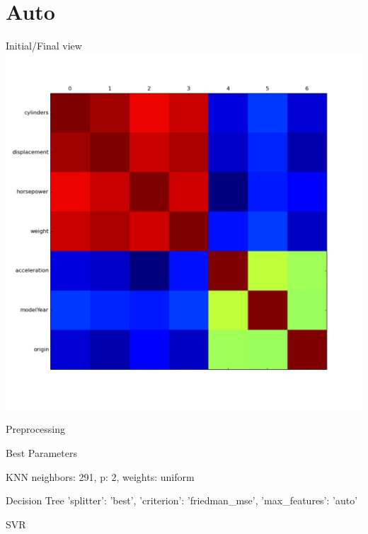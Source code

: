 \documentclass[12pt]{beamer}
\begin{document}
\section{Auto}
\begin{frame}{Initial/Final view}
\includegraphics[height=\textheight,width=\textwidth,keepaspectratio]{plots/auto_final.png}
\end{frame}

\begin{frame}{Preprocessing}

\end{frame}

\begin{frame}{Best Parameters}
\begin{block}{KNN}
neighbors: 291, p: 2, weights: uniform
\end{block}

\begin{block}{Decision Tree}
'splitter': 'best', 'criterion': 'friedman\_mse', 'max\_features': 'auto'
\end{block}

\begin{block}{SVR}

\end{block}
\end{frame}
\end{document}
